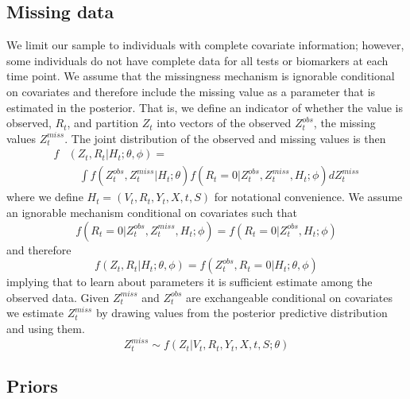 \documentclass[11pt]{article}
\begin{document}
\subsection{Missing data} 
We limit our sample to individuals with complete covariate information; however, some individuals do not have complete data for all tests or biomarkers at each time point. We assume that the missingness mechanism is ignorable conditional on covariates and therefore include the missing value as a parameter that is estimated in the posterior. That is, we define an indicator of whether the value is observed, $R_t$, and partition $Z_t$ into vectors of the observed $Z^{obs}_t$, the missing values $Z^{miss}_t$. The joint distribution of the observed and missing values is then
\begin{align*}
    f&(Z_t, R_t | H_t; \theta, \phi) = \\
    & \quad \int f(Z^{obs}_t, Z^{miss}_t | H_t; \theta) f(R_t = 0 | Z^{obs}_t, Z^{miss}_t, H_t; \phi) dZ^{miss}_t
\end{align*}
where we define $H_t = (V_t, R_t, Y_t, X, t, S)$ for notational convenience. We assume an ignorable mechanism conditional on covariates such that
\begin{equation*}
    f(R_t = 0 | Z^{obs}_t, Z^{miss}_t, H_t; \phi) = f(R_t = 0 | Z^{obs}_t, H_t; \phi)
\end{equation*}
and therefore 
\begin{equation*}
    f(Z_t, R_t | H_t; \theta, \phi) = f(Z^{obs}_t, R_t = 0 | H_t; \theta, \phi) 
\end{equation*}
implying that to learn about parameters it is sufficient estimate among the observed data. Given $Z^{miss}_t$ and $Z^{obs}_t$ are exchangeable conditional on covariates we estimate $Z^{miss}_t$ by drawing values from the posterior predictive distribution and using them. 
\begin{equation*}
    Z^{miss}_t \sim f(Z_t | V_t, R_t, Y_t, X, t, S; \theta)
\end{equation*}

\subsection{Priors}
\end{document}
